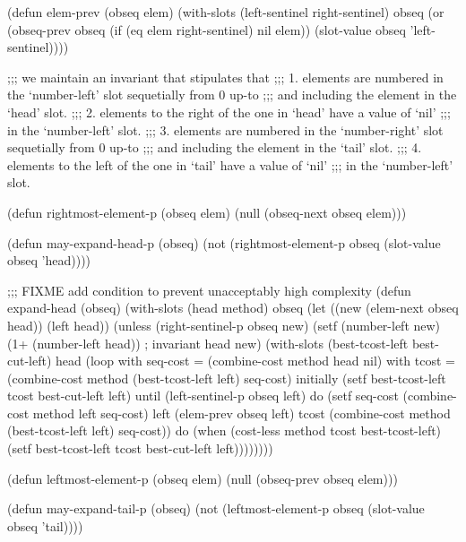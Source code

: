 (defun elem-prev (obseq elem)
  (with-slots (left-sentinel right-sentinel) obseq
    (or (obseq-prev obseq (if (eq elem right-sentinel) nil elem))
        (slot-value obseq 'left-sentinel))))

;;; we maintain an invariant that stipulates that 
;;; 1. elements are numbered in the `number-left' slot sequetially from 0 up-to
;;;    and including the element in the `head' slot. 
;;; 2. elements to the right of the one in `head' have a value of `nil'
;;;    in the `number-left' slot.
;;; 3. elements are numbered in the `number-right' slot sequetially from 0 up-to
;;;    and including the element in the `tail' slot. 
;;; 4. elements to the left of the one in `tail' have a value of `nil'
;;;    in the `number-left' slot.

(defun rightmost-element-p (obseq elem)
  (null (obseq-next obseq elem)))

(defun may-expand-head-p (obseq)
  (not (rightmost-element-p obseq (slot-value obseq 'head))))

;;; FIXME add condition to prevent unacceptably high complexity
(defun expand-head (obseq)
  (with-slots (head method) obseq
    (let ((new (elem-next obseq head))
          (left head))
      (unless (right-sentinel-p obseq new)
        (setf (number-left new) (1+ (number-left head)) ; invariant
              head new)
        (with-slots (best-tcost-left best-cut-left) head
          (loop with seq-cost = (combine-cost method head nil)
                with tcost = (combine-cost method (best-tcost-left left) seq-cost)
                initially (setf best-tcost-left tcost
                                best-cut-left left)
                until (left-sentinel-p obseq left)
                do (setf seq-cost (combine-cost method left seq-cost)
                         left (elem-prev obseq left)
                         tcost (combine-cost method (best-tcost-left left) seq-cost))
                do (when (cost-less method tcost best-tcost-left)
                     (setf best-tcost-left tcost
                           best-cut-left left))))))))

(defun leftmost-element-p (obseq elem)
  (null (obseq-prev obseq elem)))

(defun may-expand-tail-p (obseq)
  (not (leftmost-element-p obseq (slot-value obseq 'tail))))


